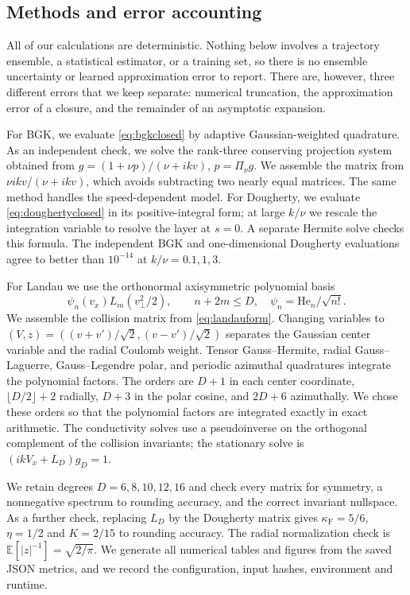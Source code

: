 \documentclass[11pt]{article}
\newcommand{\F}{\kappa_{\mathrm F}}
\newcommand{\He}{\mathrm{He}}
\theoremstyle{definition}
\theoremstyle{remark}
\numberwithin{equation}{section}
\begin{document}
\subsection{Methods and error accounting}

All of our calculations are deterministic. Nothing below involves a
trajectory ensemble, a statistical estimator, or a training set, so
there is no ensemble uncertainty or learned approximation error to
report. There are, however, three different errors that we keep
separate: numerical truncation, the approximation error of a closure, and
the remainder of an asymptotic expansion.

For BGK, we evaluate \eqref{eq:bgkclosed} by adaptive Gaussian-weighted
quadrature. As an independent check, we solve the rank-three conserving
projection system obtained from
$g=(1+\nu p)/(\nu+ikv)$, $p=\Pi_\nu g$.
We assemble the matrix from
$\nu ikv/(\nu+ikv)$, which avoids subtracting two nearly equal matrices.
The same method handles the speed-dependent model. For Dougherty, we
evaluate \eqref{eq:doughertyclosed} in its positive-integral form;
at large $k/\nu$ we rescale the integration variable to resolve the
layer at $s=0$. A separate Hermite solve checks this formula.
The independent BGK and one-dimensional Dougherty evaluations agree
to better than $10^{-14}$ at $k/\nu=0.1,1,3$.

For Landau we use the orthonormal axisymmetric polynomial basis
\[
 \psi_n(v_x)L_m(v_\perp^2/2),\qquad
 n+2m\leq D,\quad \psi_n=\He_n/\sqrt{n!}.
\]
We assemble the collision matrix from \eqref{eq:landauform}.
Changing variables to
$(V,z)=((v+v')/\sqrt2,(v-v')/\sqrt2)$ separates the Gaussian center
variable and the radial Coulomb weight. Tensor Gauss--Hermite,
radial Gauss--Laguerre, Gauss--Legendre polar, and periodic azimuthal
quadratures integrate the polynomial factors. The orders are
$D+1$ in each center coordinate, $\lfloor D/2\rfloor+2$ radially,
$D+3$ in the polar cosine, and $2D+6$ azimuthally.
We chose these orders so that the polynomial factors are integrated
exactly in exact arithmetic.
The conductivity solves use a pseudoinverse on the orthogonal complement
of the collision invariants; the stationary solve is
$(ikV_x+L_D)g_D=1$.

We retain degrees $D=6,8,10,12,16$ and check every matrix for
symmetry, a nonnegative spectrum to rounding accuracy, and the correct
invariant nullspace. As a further check, replacing $L_D$ by the Dougherty
matrix gives $\F=5/6$, $\eta=1/2$ and $K=2/15$ to rounding accuracy.
The radial normalization check is
$\mathbb E[|z|^{-1}]=\sqrt{2/\pi}$.
We generate all numerical tables and figures from the saved JSON metrics,
and we record the configuration, input hashes, environment and runtime.
\end{document}
